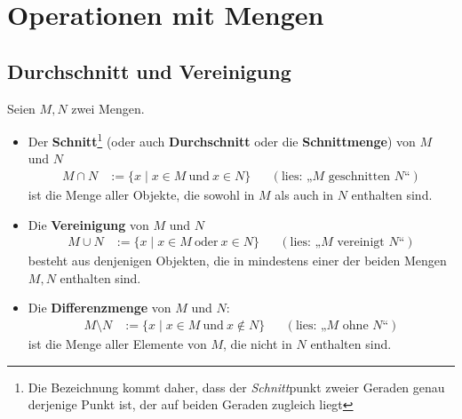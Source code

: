 \section{Operationen mit Mengen}


\subsection*{Durchschnitt und Vereinigung}


\begin{de}      \label{def:capcup}
    Seien $M,N$ zwei Mengen.
    \begin{itemize}
        \item Der \textbf{Schnitt}\footnote{Die Bezeichnung kommt daher, dass der \emph{Schnitt}punkt zweier Geraden genau derjenige Punkt ist, der auf beiden Geraden zugleich liegt} (oder auch \textbf{Durchschnitt} oder die \textbf{Schnittmenge}) von $M$ und $N$ 
        \begin{align*}
            M \cap N & := \{x \mid x \in M\ \text{und}\ x \in N\} && (\text{lies: „$M$ geschnitten $N$“})
        \end{align*}
        ist die Menge aller Objekte, die sowohl in $M$ als auch in $N$ enthalten sind.
        \item Die \textbf{Vereinigung} von $M$ und $N$
        \begin{align*}
            M \cup N & := \{x \mid x \in M\ \text{oder}\ x \in N\} && (\text{lies: „$M$ vereinigt $N$“})
        \end{align*}
        besteht aus denjenigen Objekten, die in mindestens einer der beiden Mengen $M,N$ enthalten sind.
        \item Die \textbf{Differenzmenge} von $M$ und $N$:
        \begin{align*}
            M \setminus N & := \{ x \mid x \in M \ \text{und}\ x \notin N \}  && (\text{lies: „$M$ ohne $N$“})
        \end{align*}
        ist die Menge aller Elemente von $M$, die nicht in $N$ enthalten sind.


\end{itemize}
\end{de}
